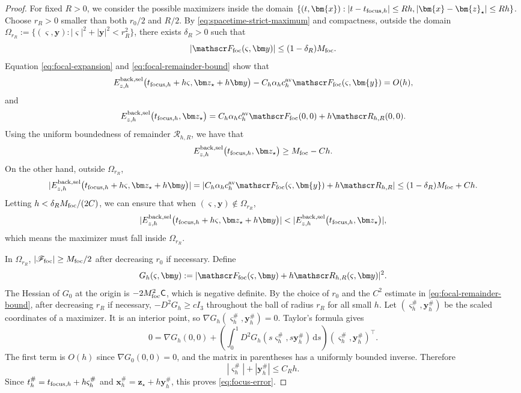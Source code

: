 \documentclass[11pt,reqno]{amsart}
\newcommand{\dd}{\,\mathrm{d}}
\numberwithin{equation}{section}
\begin{document}
\begin{proof}
For fixed $R>0$, we consider the possible maximizers inside the domain $\{(t,\bm{x}):|t-t_{{\rm focus},h}|\leq Rh, |\bm{x}-\bm{z}_\star|\leq Rh\}$. Choose $r_R>0$ smaller than both $r_0/2$ and $R/2$. By \eqref{eq:spacetime-strict-maximum} and compactness, outside the domain $\Omega_{r_R}:=\{(\varsigma,\bm y): |\varsigma|^2+|\bm y|^2 < r_R^2\}$, there exists $\delta_R>0$ such that
\begin{equation*}
 |\mathscr F_{\rm foc}(\varsigma,\bm y)|\le(1-\delta_R)M_{\rm foc}.
\end{equation*}
Equation \eqref{eq:focal-expansion} and \eqref{eq:focal-remainder-bound} show that 
$$
    E_{z,h}^{\rm back,sel}\bigl(t_{{\rm focus},h}+h\varsigma,\bm z_\star+h\bm y\bigr)-C_h\alpha_hc_h^{\rm av}\mathscr F_{\rm foc}(\varsigma,\bm{y}) = O(h),
$$
and
$$
    E_{z,h}^{\rm back,sel}\bigl(t_{{\rm focus},h},\bm z_\star\bigr)=C_h\alpha_hc_h^{\rm av}\mathscr F_{\rm foc}(0,0)+h\mathscr R_{h,R}(0,0).
$$
Using the uniform boundedness of remainder $\mathscr R_{h,R}$, we have that
$$
    E_{z,h}^{\rm back,sel}\bigl(t_{{\rm focus},h},\bm z_\star\bigr)\geq M_{\rm foc}-Ch.
$$
On the other hand, outside $\Omega_{r_R}$, 
\begin{align*}
|E_{z,h}^{\rm back,sel}\bigl(t_{{\rm focus},h}+h\varsigma,\bm z_\star+h\bm y\bigr)| = |C_h\alpha_hc_h^{\rm av}\mathscr F_{\rm foc}(\varsigma,\bm{y})+h\mathscr R_{h,R}| \leq (1-\delta_R)M_{\rm foc}+Ch.
\end{align*}
Letting $h<\delta_R M_{\rm foc}/(2C)$, we can ensure that when $(\varsigma,\bm{y})\notin\Omega_{r_R}$, 
$$
|E_{z,h}^{\rm back,sel}\bigl(t_{{\rm focus},h}+h\varsigma,\bm z_\star+h\bm y\bigr)|<|E_{z,h}^{\rm back,sel}\bigl(t_{{\rm focus},h},\bm z_\star\bigr)|,
$$
which means the maximizer must fall inside $\Omega_{r_R}$.

In $\Omega_{r_R}$, $|\mathscr F_{\rm foc}|\ge M_{\rm foc}/2$ after decreasing $r_0$ if necessary. Define
\begin{equation*}
 G_h(\varsigma,\bm y):=
 |\mathscr F_{\rm foc}(\varsigma,\bm y)+h\mathscr R_{h,R}(\varsigma,\bm y)|^2.
\end{equation*}
The Hessian of $G_0$ at the origin is $-2M_{\rm foc}^2\mathsf C$, which is negative definite. By the choice of $r_0$ and the $C^2$ estimate in \eqref{eq:focal-remainder-bound}, after decreasing $r_R$ if necessary, $-D^2G_h\ge cI_3$ throughout the ball of radius $r_R$ for all small $h$. Let $(\varsigma_h^\#,\bm y_h^\#)$ be the scaled coordinates of a maximizer. It is an interior point, so $\nabla G_h(\varsigma_h^\#,\bm y_h^\#)=0$. Taylor's formula gives
\begin{equation*}
 0=\nabla G_h(0,0)+\left(\int_0^1D^2G_h(s\varsigma_h^\#,s\bm y_h^\#)\dd s\right)(\varsigma_h^\#,\bm y_h^\#)^\top.
\end{equation*}
The first term is $O(h)$ since $\nabla G_0(0,0)=0$, and the matrix in parentheses has a uniformly bounded inverse. Therefore
\begin{equation*}
 |\varsigma_h^\#|+|\bm y_h^\#|\le C_Rh.
\end{equation*}
Since $t_h^\#=t_{{\rm focus},h}+h\varsigma_h^\#$ and $\bm x_h^\#=\bm z_\star+h\bm y_h^\#$, this proves \eqref{eq:focus-error}.


\end{proof}
\end{document}
